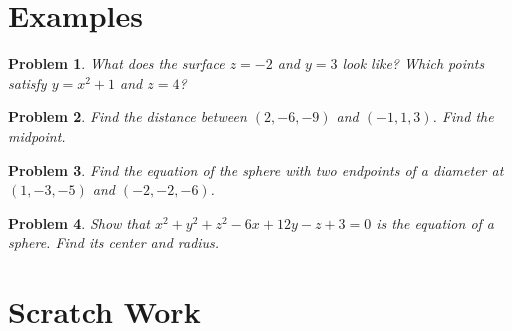 \documentclass[11pt]{article}
\newtheorem{problem}{Problem}
\begin{document}
\newpage

\section{Examples}

\begin{problem}
    What does the surface $z=-2$ and $y=3$ look like? Which points satisfy $y=x^2+1$ and $z=4$?
\end{problem}

\vspace{5.5cm}


\begin{problem}
Find the distance between $(2,-6,-9)$ and $(-1,1,3)$. Find the midpoint.
\end{problem}

\vspace{5.5cm}

\begin{problem}
    Find the equation of the sphere with two endpoints of a diameter at $(1,-3,-5)$ and $(-2,-2,-6)$.
\end{problem}

\vspace{5.75cm}

\begin{problem}
Show that $x^2+y^2+z^2 -6x+12y-z+3=0$ is the equation of a sphere. Find its center and radius.
\end{problem}

\newpage

\section{Scratch Work}
\end{document}

